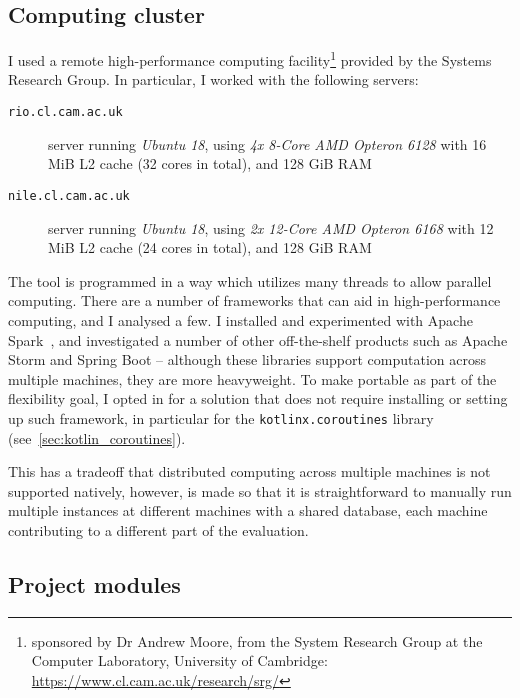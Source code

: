 \subsection{Computing cluster}\label{sec:computing_cluster}

I used a remote high-performance computing facility\footnote{sponsored by Dr Andrew Moore, from the System Research Group at the Computer Laboratory, University of Cambridge: \url{https://www.cl.cam.ac.uk/research/srg/}} provided by the Systems Research Group.
In particular, I worked with the following servers:

\begin{description}
    \item[\texttt{rio.cl.cam.ac.uk}] server running \textsl{Ubuntu 18}, using \textsl{4x 8-Core AMD Opteron 6128} with 16 MiB L2 cache (32 cores in total), and 128 GiB RAM
    \item[\texttt{nile.cl.cam.ac.uk}] server running \textsl{Ubuntu 18}, using \textsl{2x 12-Core AMD Opteron 6168} with 12 MiB L2 cache (24 cores in total), and 128 GiB RAM
\end{description}

The \graffs tool is programmed in a way which utilizes many threads to allow parallel computing.
There are a number of frameworks that can aid in high-performance computing, and I analysed a few.
I installed and experimented with Apache Spark~\cite{ZahariaApacheSparkUnified2016}, and investigated a number of other off-the-shelf products such as Apache Storm and Spring Boot -- although these libraries support computation across multiple machines, they are more heavyweight.
To make \graffs portable as part of the flexibility goal, I opted in for a solution that does not require installing or setting up such framework, in particular for the \texttt{kotlinx.coroutines} library~\cite{TorresLearningConcurrencyKotlin2018} (see~\autoref{sec:kotlin_coroutines}).

This has a tradeoff that distributed computing across multiple machines is not supported natively, however, \graffs is made so that it is straightforward to manually run multiple instances at different machines with a shared database, each machine contributing to a different part of the evaluation.

\subsection{Project modules}

